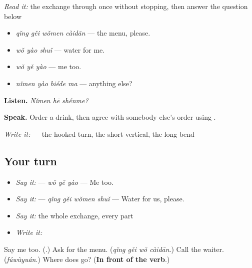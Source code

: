 \begin{tcolorbox}[breakable,skin=enhanced,colback=orange!6,colframe=orange!45!black,boxrule=0.5pt,arc=1mm,left=6pt,right=6pt,top=4pt,bottom=4pt,fonttitle=\bfseries,title={Read this}]
\emph{Read it:} the exchange through once without stopping, then answer the question below
\end{tcolorbox}

\begin{grammarlens}[title={What you've built — ordering at a table}]
\begin{itemize}
\raggedright
  \item \emph{qǐng gěi wǒmen càidān} — the menu, please.
  \item \textbf{} \emph{wǒ yào shuǐ} — water for me.
  \item \textbf{} \emph{wǒ yě yào} — me too.
  \item \emph{nǐmen yào biéde ma} — anything else?
\end{itemize}

\textbf{Listen.} \emph{Nǐmen hē shénme?}

\textbf{Speak.} Order a drink, then agree with somebody else's order using .

\emph{Write it:}  — the hooked turn, the short vertical, the long bend
\end{grammarlens}

\subsection*{Your turn}
\begin{itemize}
\raggedright
  \item \emph{Say it:}  — \emph{wǒ yě yào} — Me too.
  \item \emph{Say it:}  — \emph{qǐng gěi wǒmen shuǐ} — Water for us, please.
  \item \emph{Say it:} the whole exchange, every part
  \item \emph{Write it:} 
\end{itemize}

\begin{tcolorbox}[breakable,colback=teal!4,colframe=teal!35!black,title={Before you move on}]
Say me too. (\textbf{}.) Ask for the menu. (\emph{qǐng gěi wǒ càidān}.) Call the waiter. (\emph{fúwùyuán}.) Where does  go? (\textbf{In front of the verb}.)
\end{tcolorbox}
